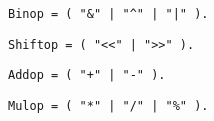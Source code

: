 \begin{samepage}
\begin{lstlisting}[language=EBNF]
Binop = ( "&" | "^" | "|" ).
\end{lstlisting}
\end{samepage}


\begin{samepage}
\begin{lstlisting}[language=EBNF]
Shiftop = ( "<<" | ">>" ).
\end{lstlisting}
\end{samepage}


\begin{samepage}
\begin{lstlisting}[language=EBNF]
Addop = ( "+" | "-" ).
\end{lstlisting}
\end{samepage}


\begin{samepage}
\begin{lstlisting}[language=EBNF]
Mulop = ( "*" | "/" | "%" ).
\end{lstlisting}
\end{samepage}